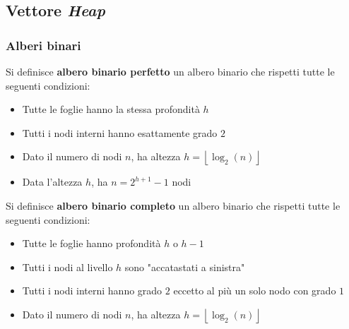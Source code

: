     \subsection{Vettore \textit{Heap}}
        \subsubsection{Alberi binari}
            \begin{definition}
                Si definisce \textbf{albero binario perfetto} un albero binario che rispetti tutte le seguenti condizioni:
                \begin{itemize}
                    \item Tutte le foglie hanno la stessa profondità $h$
                    \item Tutti i nodi interni hanno esattamente grado $2$
                    \item Dato il numero di nodi $n$, ha altezza $h = \left\lfloor\log_2(n)\right\rfloor$
                    \item Data l'altezza $h$, ha $n=2^{h+1}-1$ nodi
                \end{itemize}
            \end{definition}
            \begin{definition}
                Si definisce \textbf{albero binario completo} un albero binario che rispetti tutte le seguenti condizioni:
                \begin{itemize}
                    \item Tutte le foglie hanno profondità $h$ o $h-1$
                    \item Tutti i nodi al livello $h$ sono "accatastati a sinistra"
                    \item Tutti i nodi interni hanno grado $2$ eccetto al più un solo nodo con grado $1$
                    \item Dato il numero di nodi $n$, ha altezza $h = \left\lfloor\log_2(n)\right\rfloor$
                \end{itemize}
            \end{definition}
